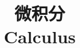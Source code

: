 \documentclass{../thunote}
\begin{document}
\title{微积分\\Calculus}
\maketitle

\frontmatter
\tableofcontents

\mainmatter




\end{document}
